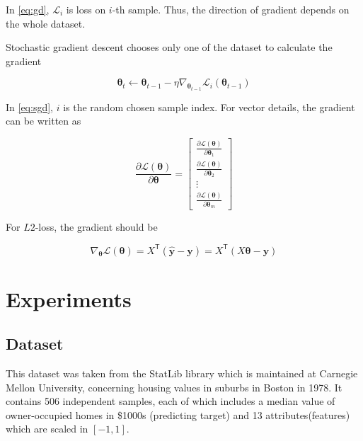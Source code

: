 \documentclass[journal, a4paper]{IEEEtran}
\begin{document}
In \eqref{eq:gd}, $\mathcal{L}_i$ is loss on $i$-th sample. Thus, the direction of gradient depends on the whole dataset. 

Stochastic gradient descent chooses only one of the dataset to calculate the gradient

\begin{equation}\label{eq:sgd}
    \boldsymbol\theta_t \leftarrow \boldsymbol\theta_{t-1} - \eta\nabla_{\boldsymbol\theta_{t-1}}\mathcal{L}_i(\boldsymbol\theta_{t-1})
\end{equation}

In \eqref{eq:sgd}, $i$ is the random chosen sample index. For vector details, the gradient can be written as

\begin{equation}\label{eq:gradient}   
    \frac{\partial\mathcal{L}(\boldsymbol\theta)}{\partial\boldsymbol\theta} = 
    \begin{bmatrix}
        \frac{\partial\mathcal{L}(\boldsymbol\theta)}{\partial\boldsymbol\theta_1} \\
        \frac{\partial\mathcal{L}(\boldsymbol\theta)}{\partial\boldsymbol\theta_2} \\
        \vdots \\
        \frac{\partial\mathcal{L}(\boldsymbol\theta)}{\partial\boldsymbol\theta_m}
    \end{bmatrix}
\end{equation}

For $L2$-loss, the gradient should be

\begin{equation}\label{eq:l2loss-gradient}
    \nabla_{\boldsymbol\theta}\mathcal{L}(\boldsymbol\theta) = X^{\mathsf{T}}(\mathbf{\hat{y}} - \mathbf{y}) = X^{\mathsf{T}}(X\boldsymbol\theta - \mathbf{y})
\end{equation}

\section{Experiments}
\subsection{Dataset}

    This dataset was taken from the StatLib library which is maintained at Carnegie Mellon University, concerning housing values in suburbs in Boston in 1978. It contains 506 independent samples, each of which includes a median value of owner-occupied homes in \$1000\textquotesingle s (predicting target) and 13 attributes(features) which are scaled in $[-1, 1]$.
\end{document}
